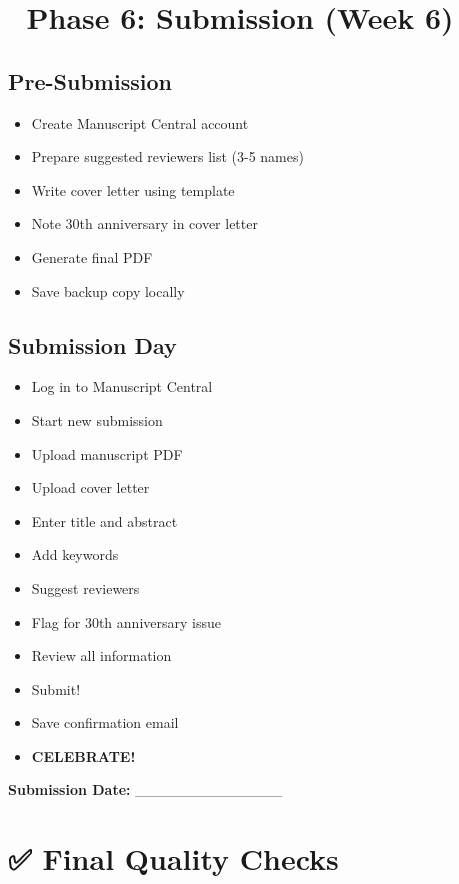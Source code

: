 \documentclass[11pt]{article}
\begin{document}
\section*{🚀 Phase 6: Submission (Week 6)}

\subsection*{Pre-Submission}
\begin{itemize}[label=$\square$]
    \item Create Manuscript Central account
    \item Prepare suggested reviewers list (3-5 names)
    \item Write cover letter using template
    \item Note 30th anniversary in cover letter
    \item Generate final PDF
    \item Save backup copy locally
\end{itemize}

\subsection*{Submission Day}
\begin{itemize}[label=$\square$]
    \item Log in to Manuscript Central
    \item Start new submission
    \item Upload manuscript PDF
    \item Upload cover letter
    \item Enter title and abstract
    \item Add keywords
    \item Suggest reviewers
    \item Flag for 30th anniversary issue
    \item Review all information
    \item Submit!
    \item Save confirmation email
    \item \textbf{CELEBRATE! 🎉}
\end{itemize}

\textbf{Submission Date:} \_\_\_\_\_\_\_\_\_\_\_\_\_\_

\section*{✅ Final Quality Checks}
\end{document}
